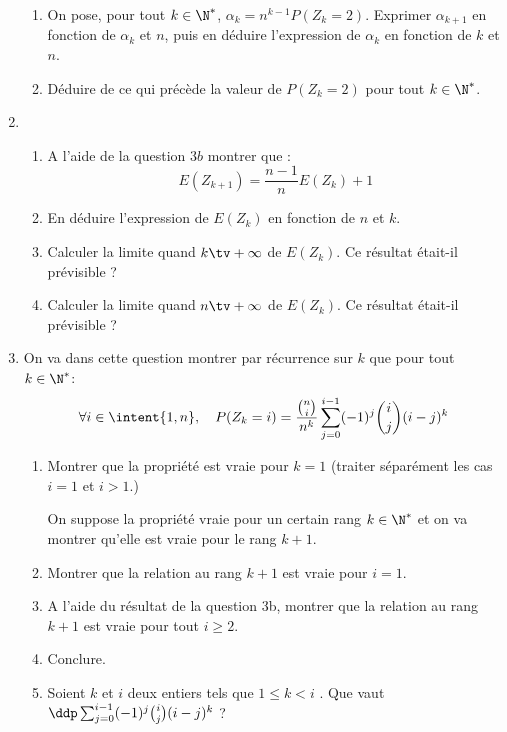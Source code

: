 \begin{probleme}
\begin{enumerate}
\begin{enumerate}
\item On pose, pour tout $k\in \N^*$, $\alpha_k =n^{k-1} P(Z_k =2)$. Exprimer $\alpha_{k+1} $ en fonction de $\alpha_k$ et $n$, puis en déduire l'expression de $\alpha_k$ en fonction de $k$ et $n$. 

\item Déduire de ce qui précède  la valeur de $P(Z_k=2) $ pour tout $k\in \N^*$. 
\end{enumerate}
\item \begin{enumerate}
\item A l'aide de la question $3b$ montrer que :
$$E(Z_{k+1}) = \frac{n-1}{n} E(Z_k) +1$$
\item En déduire l'expression de $E(Z_k)$ en fonction de $n$ et $k$. 
\item Calculer la limite quand $k\tv +\infty$ de $E(Z_k)$. Ce résultat  était-il prévisible ? 
\item  Calculer la limite quand $n\tv +\infty$ de $E(Z_k)$. Ce résultat  était-il prévisible ? 


\end{enumerate}
\item On va dans cette question montrer par récurrence sur $k$ que pour tout $k\in \N^*$:
$$\forall i\in \intent{ 1, n}, \quad P(Z_k =i) =\frac{\binom{n}{i}}{n^k} \sum_{j=0}^{i-1} (-1)^j \binom{i}{j}(i-j)^k$$
\begin{enumerate}
\item Montrer que la propriété est vraie pour $k=1$ (traiter séparément les cas $i=1$ et $i>1$.) 


On suppose la propriété vraie pour un certain rang $k\in \N^*$ et on va montrer qu'elle est vraie pour le rang $k+1$. 
\item Montrer que la relation au rang $k+1$ est vraie pour $i=1$. 



\item A l'aide du résultat de la question 3b, montrer que la relation au rang $k+1$ est vraie pour tout $i\geq 2$. 



\item Conclure. 

\item Soient $k$ et $i$ deux entiers tels que $1\leq k < i $ . Que vaut $\ddp \sum_{j=0}^{i-1} (-1)^j \binom{i}{j}(i-j)^k$ ?



\end{enumerate}

\end{enumerate}
\end{probleme}






